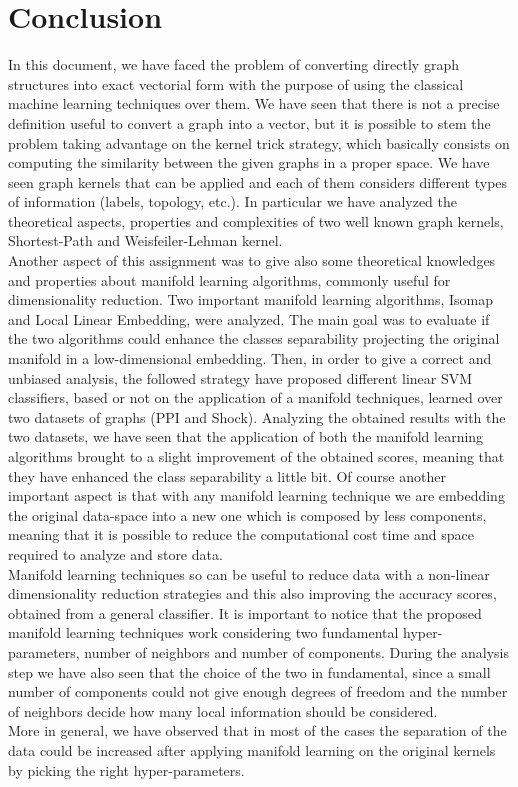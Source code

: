 \documentclass[11pt,a4paper]{article}
\begin{document}
\newpage

\section{Conclusion}
In this document, we have faced the problem of converting directly graph structures into exact vectorial form with the purpose of using the classical machine learning techniques over them. We have seen that there is not a precise definition useful to convert a graph into a vector, but it is possible to stem the problem taking advantage on the kernel trick strategy, which basically consists on computing the similarity between the given graphs in a proper space. We have seen  graph kernels that can be applied and each of them considers different types of information (labels, topology, etc.). In particular we have analyzed the theoretical aspects, properties and complexities of two well known graph kernels, Shortest-Path and Weisfeiler-Lehman kernel. \\
Another aspect of this assignment was to give also some theoretical knowledges and properties about manifold learning algorithms, commonly useful for dimensionality reduction. Two important manifold learning algorithms, Isomap and Local Linear Embedding, were analyzed. The main goal was to evaluate if the two algorithms could enhance the classes separability projecting the original manifold in a low-dimensional embedding. Then, in order to give a correct and unbiased analysis, the followed strategy have proposed different linear SVM classifiers, based or not on the application of a manifold techniques, learned over two datasets of graphs (PPI and Shock).
Analyzing the obtained results with the two datasets, we have seen that the application of both the manifold learning algorithms brought to a slight improvement of the obtained scores, meaning that they have enhanced the class separability a little bit. Of course another important aspect is that with any manifold learning technique we are embedding the original data-space into a new one which is composed by less components, meaning that it is possible to reduce the computational cost time and space required to analyze and store data. \\
Manifold learning techniques so can be useful to reduce data with a non-linear dimensionality reduction strategies and this also improving the accuracy scores, obtained from a general classifier. It is important to notice that the proposed manifold learning techniques work considering two fundamental hyper-parameters, number of neighbors and number of components. During the analysis step we have also seen that the choice of the two in fundamental, since a small number of components could not give enough degrees of freedom and the number of neighbors decide how many local information should be considered.\\
More in general, we have observed that in most of the cases the separation of the data could be increased after applying manifold learning on the original kernels by picking the right hyper-parameters. 
\end{document}
